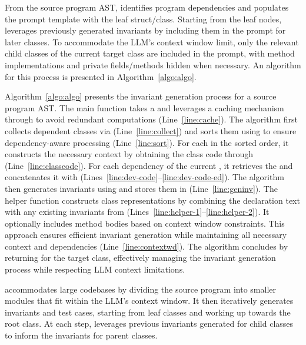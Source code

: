 From the source program AST, \tech identifies program dependencies and populates the prompt template with the leaf struct/class. Starting from the leaf nodes, \tech leverages previously generated invariants by including them in the prompt for later classes. 
To accommodate the LLM's context window limit, only the relevant child classes of the current target class are included in the prompt, with method implementations and private fields/methods hidden when necessary. An algorithm for this process is presented in Algorithm~\ref{algo:algo}.

Algorithm~\ref{algo:algo} presents the invariant generation process for a source program AST. The main function \GenerateInvariant takes a  and leverages a caching mechanism through  to avoid redundant computations (Line~\ref{line:cache}).
The algorithm first collects dependent classes via \getClassRecursively (Line~\ref{line:collect}) and sorts them using \sort to ensure dependency-aware processing (Line~\ref{line:sort}). For each  in the sorted order, it constructs the necessary context by obtaining the class code through \getCodeForClass (Line~\ref{line:classcode}). For each dependency  of the current , it retrieves the  and concatenates it with  (Lines~\ref{line:dev-code}--\ref{line:dev-code-ed}). 
The algorithm then generates invariants using \getCompletions and stores them in  (Line~\ref{line:geninv}).
The helper function \getCodeForClass constructs class representations by combining the declaration text with any existing invariants from  (Lines~\ref{line:helper-1}--\ref{line:helper-2}).
It optionally includes method bodies based on context window constraints. This approach ensures efficient invariant generation while maintaining all necessary context and dependencies (Line~\ref{line:contextwd}).
The algorithm concludes by returning  for the target class, effectively managing the invariant generation process while respecting LLM context limitations.


\tech accommodates large codebases by dividing the source program into smaller modules that fit within the LLM’s context window. It then iteratively generates invariants and test cases, starting from leaf classes and working up towards the root class. At each step, \tech leverages previous invariants generated for child classes to inform the invariants for parent classes.

